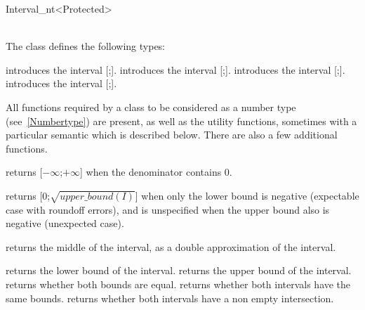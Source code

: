 \begin{ccRefClass}{Interval_nt<Protected>}
\ccIsModel
{}\\
\\

\ccTypes
The class  defines the following types:
\ccGlue
{}
\ccGlue
{}


\ccCreation

{introduces the interval [;].}
\ccGlue
{}
{introduces the interval [;].}
\ccGlue
{}
{introduces the interval [;].}
\ccGlue
{}
{introduces the interval [;].}


\ccOperations

All functions required by a class to be considered as a {\cgal} number type
(see~\ref{Numbertype}) are present, as well as the utility functions,
sometimes with a particular semantic which is described below.  There are also
a few additional functions.


 {returns
[$-\infty$;$+\infty$] when the denominator contains 0.}

 {returns
[0;$\sqrt{upper\_bound(I)}$] when only the lower bound is negative (expectable
case with roundoff errors), and is unspecified when the upper bound also is
negative (unexpected case).}

 {returns the
middle of the interval, as a double approximation of the interval.}

 {returns the lower bound of the interval.}
 {returns the upper bound of the interval.}
 {returns whether both bounds are equal.}
 {returns whether both intervals have
the same bounds.}
 {returns whether both intervals
have a non empty intersection.}


\end{ccRefClass}
